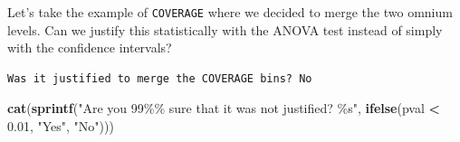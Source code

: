 \documentclass[
  english,
  11pt,
]{article}
\newenvironment{Shaded}{\begin{snugshade}}{\end{snugshade}}
\newcommand{\AttributeTok}[1]{\textcolor[rgb]{0.13,0.29,0.53}{#1}}
\newcommand{\DecValTok}[1]{\textcolor[rgb]{0.00,0.00,0.81}{#1}}
\newcommand{\FloatTok}[1]{\textcolor[rgb]{0.00,0.00,0.81}{#1}}
\newcommand{\FunctionTok}[1]{\textcolor[rgb]{0.13,0.29,0.53}{\textbf{#1}}}
\newcommand{\NormalTok}[1]{#1}
\newcommand{\OtherTok}[1]{\textcolor[rgb]{0.56,0.35,0.01}{#1}}
\newcommand{\SpecialCharTok}[1]{\textcolor[rgb]{0.81,0.36,0.00}{\textbf{#1}}}
\newcommand{\StringTok}[1]{\textcolor[rgb]{0.31,0.60,0.02}{#1}}
\begin{document}
Let's take the example of \texttt{COVERAGE} where we decided to merge
the two omnium levels. Can we justify this statistically with the ANOVA
test instead of simply with the confidence intervals?

\begin{Shaded}
\end{Shaded}

\begin{verbatim}
Was it justified to merge the COVERAGE bins? No
\end{verbatim}

\begin{Shaded}
\begin{Highlighting}[]
\FunctionTok{cat}\NormalTok{(}\FunctionTok{sprintf}\NormalTok{(}\StringTok{"Are you 99\%\% sure that it was not justified? \%s"}\NormalTok{, }\FunctionTok{ifelse}\NormalTok{(pval }\SpecialCharTok{\textless{}} \FloatTok{0.01}\NormalTok{, }\StringTok{"Yes"}\NormalTok{, }\StringTok{"No"}\NormalTok{)))}
\end{Highlighting}
\end{Shaded}
\end{document}
